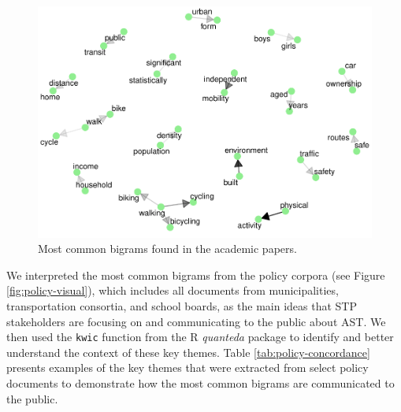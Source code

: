 \documentclass[]{elsarticle} %
\begin{document}
\begin{figure}

{\centering \includegraphics[width=1\linewidth]{AST-Framing-Ontario_files/figure-latex/academic-visual-1} 

}

\caption{Most common bigrams found in the academic papers.}\label{fig:academic-visual}
\end{figure}

We interpreted the most common bigrams from the policy corpora (see
Figure \ref{fig:policy-visual}), which includes all documents from
municipalities, transportation consortia, and school boards, as the main
ideas that STP stakeholders are focusing on and communicating to the
public about AST. We then used the \texttt{kwic} function from the R
\emph{quanteda} package to identify and better understand the context of
these key themes. Table \ref{tab:policy-concordance} presents examples
of the key themes that were extracted from select policy documents to
demonstrate how the most common bigrams are communicated to the public.
\end{document}
